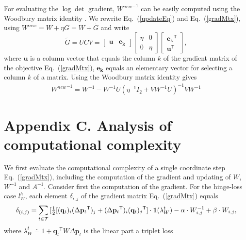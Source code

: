 \documentclass[twoside,11pt]{article}
\newcommand\mat[1]{{#1}}
\renewcommand\vec[1]{\mathbf{#1}}
\newcommand{\T}{{}^\mathsf{T}}
\newcommand{\W}{\mat{W}}
\newcommand{\newW}{{\mat{W^{new}}}}
\newcommand{\eqdef}{\doteq}
\newcommand{\q}{{\vec{q}}}
\newcommand{\p}{{\vec{p}}}
\newcommand{\trip}{{t}}
\newcommand{\qt}{{\q_{\trip}}}
\newcommand{\invA}{A^{-1}}
\renewcommand{\eqref}[1]{Eq.~(\ref{#1})}
\begin{document}
For evaluating the $\log\det$ gradient, $\newW^{-1}$ can be easily computed using the Woodbury matrix
identity \citep{woodbury1950inverting}. We rewrite \eqref{updateEq} and \eqref{gradMtx}, using $\newW = \W + \eta G = \W+\mat{\widetilde{G}}$
and write
\begin{equation}
  \mat{\widetilde{G}} = \mat{U}\mat{C}\mat{V} = \left[ \begin{matrix}
      \vec{u} & \vec{e_k} \end{matrix} \right] \left[ \begin{matrix}
      \eta & 0 \\ 0 & \eta \end{matrix} \right] \left[ \begin{matrix}
      \vec{e_k}\T \\ \vec{u}\T \end{matrix} \right],
  \label{gradMtxWDB}
  \nonumber 
\end{equation}
where $\vec{u}$ is a column vector that equals the column $k$ of the gradient matrix of the objective \eqref{gradMtx},
$\vec{e_k}$ equals an elementary vector for selecting a column $k$ of
a matrix. 
Using the Woodbury matrix identity gives 
\begin{equation}
    \begin{array}{lcl}
    \newW^{-1} = 
    \W^{-1} - \W^{-1} \mat{U} (\eta^{-1} I_2 + \mat{V}     \W^{-1} \mat{U})^{-1} \mat{V} \W^{-1}
    \end{array}
    \nonumber
    \label{InvWwdb}
\end{equation}

 

\section*{Appendix C. Analysis of computational complexity}

We first evaluate the computational complexity of a single coordinate step \eqref{gradMtx}, including the computation of the gradient and updating of $\W$, $\W^{-1}$ and $\invA$. Consider first the computation of the gradient. For the hinge-loss case $l^{h}_W$, each element $\delta_{i,j}$ of the gradient matrix \eqref{gradMtx} equals
\begin{equation}
    \delta_{(i,j)} = \sum\limits_{t\in \cal{T}}{ [\tfrac{1}{2}[(\vec{q}_{t})_i(\Delta\vec{p}_{t}\T)_j + (\Delta\vec{p}_{t}\T)_i(\vec{q}_{t})_j\T] } \cdot \textbf{1}(\lambda_{W}^t) - \alpha \cdot \W^{-1}_{i,j} + \beta \cdot \W_{i,j},
\label{gradMatElem}
\end{equation}
where $\lambda_{W}^t \eqdef 1+\qt\T \W \Delta\p_{t}$ is the linear part a triplet loss
\end{document}
